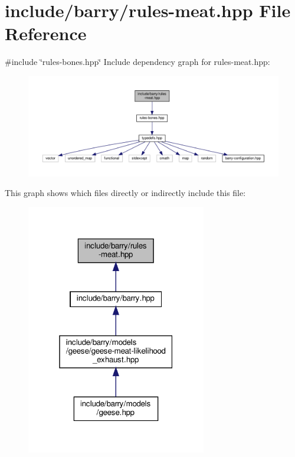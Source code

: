 \hypertarget{rules-meat_8hpp}{}\section{include/barry/rules-\/meat.hpp File Reference}
\label{rules-meat_8hpp}
{\ttfamily \#include \char`\"{}rules-\/bones.\+hpp\char`\"{}}\newline
Include dependency graph for rules-\/meat.hpp\+:\nopagebreak
\begin{figure}[H]
\begin{center}
\leavevmode
\includegraphics[width=350pt]{rules-meat_8hpp__incl}
\end{center}
\end{figure}
This graph shows which files directly or indirectly include this file\+:\nopagebreak
\begin{figure}[H]
\begin{center}
\leavevmode
\includegraphics[width=223pt]{rules-meat_8hpp__dep__incl}
\end{center}
\end{figure}
